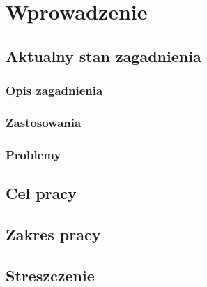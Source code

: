 \chapter{Wprowadzenie}
\label{t:wprowadzenie}


	\section{Aktualny stan zagadnienia}
	\label{t:wprowadzenie:stan}
	
		\subsection{Opis zagadnienia}
		\label{t:wprowadzenie:stan:opis}
		
		\subsection{Zastosowania}
		\label{t:wprowadzenie:stan:zastosowania}
		
		\subsection{Problemy}
		\label{t:wprowadzenie:stan:problemy}
		
		
	\section{Cel pracy}
	\label{t:wprowadzenie:cel}
	
	
	\section{Zakres pracy}
	\label{t:wprowadzenie:zakres}
	
	
	\section{Streszczenie}
	\label{t:wprowadzenie:streszczenie}
